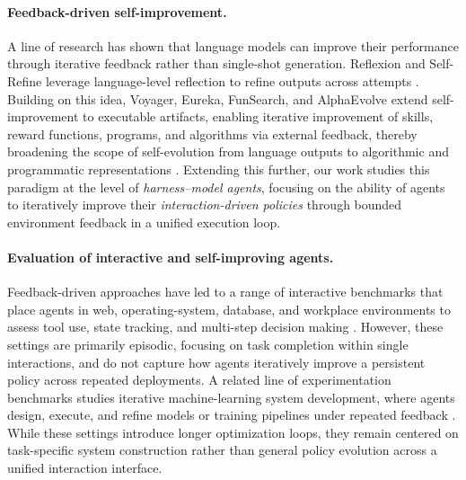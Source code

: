 \paragraph{Feedback-driven self-improvement.}
A line of research has shown that language models can improve their performance through iterative feedback rather than single-shot generation. Reflexion and Self-Refine leverage language-level reflection to refine outputs across attempts \citep{reflexion,selfrefine}. Building on this idea, Voyager, Eureka, FunSearch, and AlphaEvolve extend self-improvement to executable artifacts, enabling iterative improvement of skills, reward functions, programs, and algorithms via external feedback, thereby broadening the scope of self-evolution from language outputs to algorithmic and programmatic representations \citep{voyager,eureka,funsearch,alphaevolve}. Extending this further, our work studies this paradigm at the level of \emph{harness--model agents}, focusing on the ability of agents to iteratively improve their \emph{interaction-driven policies} through bounded environment feedback in a unified execution loop.


\paragraph{Evaluation of interactive and self-improving agents.}
Feedback-driven approaches have led to a range of interactive benchmarks that place agents in web, operating-system, database, and workplace environments to assess tool use, state tracking, and multi-step decision making \citep{agentbench,webarena,osworld,workarena}. However, these settings are primarily episodic, focusing on task completion within single interactions, and do not capture how agents iteratively improve a persistent policy across repeated deployments. A related line of experimentation benchmarks studies iterative machine-learning system development, where agents design, execute, and refine models or training pipelines under repeated feedback \citep{mlagentbench,mlebench}. While these settings introduce longer optimization loops, they remain centered on task-specific system construction rather than general policy evolution across a unified interaction interface.



